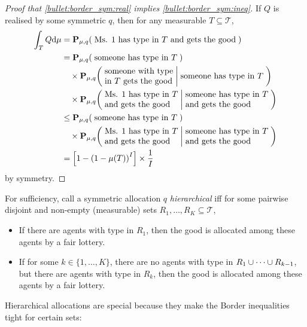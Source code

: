 \begin{proof}[Proof that \ref{bullet:border_sym:real} implies \ref{bullet:border_sym:ineq}]
	If $Q$ is realised by some symmetric $q$,
	then for any measurable $T \subseteq \mathcal{T}$,
	\begin{align*}
		\int_T Q \dd \mu
		&= \PP_{\mu,q}\left( \;\text{Ms. 1 has type in $T$ and gets the good}\; \right)
		\\
		&= \PP_{\mu,q}\left( \;\text{someone has type in $T$}\; \right)
		\\
		&\quad\times \PP_{\mu,q}\left( \;\parbox{\widthof{someone with type}}{someone with type in $T$ gets the good}\;
		\middle| \;\text{someone has type in $T$}\; \right)
		\\
		&\quad\times \PP_{\mu,q}\left( \;\parbox{\widthof{Ms. 1 has type in $T$}}{Ms. 1 has type in $T$ and gets the good}\;
		\middle|
		\;\parbox{\widthof{someone has type in $T$}}{someone has type in $T$ and gets the good}\; \right)
		\\
		&\leq \PP_{\mu,q}\left( \;\text{someone has type in $T$}\; \right)
		\\
		&\quad\times \PP_{\mu,q}\left( \;\parbox{\widthof{Ms. 1 has type in $T$}}{Ms. 1 has type in $T$ and gets the good}\;
		\middle|
		\;\parbox{\widthof{someone has type in $T$}}{someone has type in $T$ and gets the good}\; \right)
		\\
		&= \left[ 1 - \left( 1 - \mu(T) \right)^I \right] \times \frac{1}{I} 
	\end{align*}
	by symmetry.
\end{proof}

For sufficiency, call a symmetric allocation $q$ \emph{hierarchical}
iff for some pairwise disjoint and non-empty (measurable) sets $R_1,\dots,R_K \subseteq \mathcal{T}$,
%
\begin{itemize}

	\item If there are agents with type in $R_1$,
	then the good is allocated among these agents by a fair lottery.

	\item If for some $k \in \{1,\dots,K\}$,
	there are no agents with type in $R_1 \cup \cdots \cup R_{k-1}$,
	but there are agents with type in $R_k$,
	then the good is allocated among these agents by a fair lottery.

\end{itemize}
%
Hierarchical allocations are special because they make the Border inequalities tight for certain sets:

